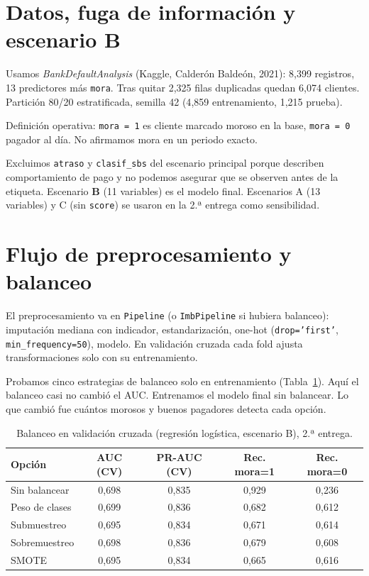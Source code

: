 \documentclass[11pt]{article}
\begin{document}
\section{Datos, fuga de información y escenario B}

Usamos \textit{BankDefaultAnalysis} (Kaggle, Calderón Baldeón, 2021): 8{,}399 registros, 13 predictores más \texttt{mora}. Tras quitar 2{,}325 filas duplicadas quedan 6{,}074 clientes. Partición 80/20 estratificada, semilla 42 (4{,}859 entrenamiento, 1{,}215 prueba).

Definición operativa: \texttt{mora = 1} es cliente marcado moroso en la base, \texttt{mora = 0} pagador al día. No afirmamos mora en un periodo exacto.

Excluimos \texttt{atraso} y \texttt{clasif\_sbs} del escenario principal porque describen comportamiento de pago y no podemos asegurar que se observen antes de la etiqueta. Escenario \textbf{B} (11 variables) es el modelo final. Escenarios A (13 variables) y C (sin \texttt{score}) se usaron en la 2.ª entrega como sensibilidad.

\section{Flujo de preprocesamiento y balanceo}

El preprocesamiento va en \texttt{Pipeline} (o \texttt{ImbPipeline} si hubiera balanceo): imputación mediana con indicador, estandarización, one-hot (\texttt{drop='first'}, \texttt{min\_frequency=50}), modelo. En validación cruzada cada fold ajusta transformaciones solo con su entrenamiento.

Probamos cinco estrategias de balanceo solo en entrenamiento (Tabla~\ref{tab:balanceo}). Aquí el balanceo casi no cambió el AUC. Entrenamos el modelo final sin balancear. Lo que cambió fue cuántos morosos y buenos pagadores detecta cada opción.

\begin{table}[H]
\centering
\caption{Balanceo en validación cruzada (regresión logística, escenario B), 2.ª entrega.}
\label{tab:balanceo}
\small
\begin{tabular}{@{}lcccc@{}}
\toprule
\textbf{Opción} & \textbf{AUC (CV)} & \textbf{PR-AUC (CV)} & \textbf{Rec. mora=1} & \textbf{Rec. mora=0} \\
\midrule
Sin balancear & 0,698 & 0,835 & 0,929 & 0,236 \\
Peso de clases & 0,699 & 0,836 & 0,682 & 0,612 \\
Submuestreo & 0,695 & 0,834 & 0,671 & 0,614 \\
Sobremuestreo & 0,698 & 0,836 & 0,679 & 0,608 \\
SMOTE & 0,695 & 0,834 & 0,665 & 0,616 \\
\bottomrule
\end{tabular}
\end{table}
\end{document}

